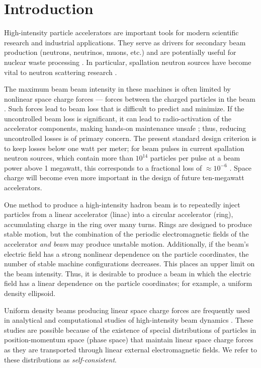 \chapter{Introduction}\label{chap-1}

High-intensity particle accelerators are important tools for modern scientific research and industrial applications. They serve as drivers for secondary beam production (neutrons, neutrinos, muons, etc.) \cite{Geer2009} and are potentially useful for nuclear waste processing \cite{Yee-Rendon2021}. In particular, spallation neutron sources have become vital to neutron scattering research \cite{Garoby2017}.

The maximum beam beam intensity in these machines is often limited by nonlinear space charge forces — forces between the charged particles in the beam \cite{Hofmann2017Book}. Such forces lead to beam loss that is difficult to predict and minimize. If the uncontrolled beam loss is significant, it can lead to radio-activation of the accelerator components, making hands-on maintenance unsafe \cite{Bungau2014}; thus, reducing uncontrolled losses is of primary concern. The present standard design criterion is to keep losses below one watt per meter; for beam pulses in current spallation neutron sources, which contain more than $10^{14}$ particles per pulse at a beam power above 1 megawatt, this corresponds to a fractional loss of $\approx 10^{-6}$ \cite{Henderson2014}. Space charge will become even more important in the design of future ten-megawatt accelerators. 
 
One method to produce a high-intensity hadron beam is to repeatedly inject particles from a linear accelerator (linac) into a circular accelerator (ring), accumulating charge in the ring over many turns. Rings are designed to produce stable motion, but the combination of the periodic electromagnetic fields of the accelerator \textit{and beam} may produce unstable motion. Additionally, if the beam's electric field has a strong nonlinear dependence on the particle coordinates, the number of stable machine configurations decreases. This places an upper limit on the beam intensity. Thus, it is desirable to produce a beam in which the electric field has a linear dependence on the particle coordinates; for example, a uniform density ellipsoid.

Uniform density beams producing linear space charge forces are frequently used in analytical and computational studies of high-intensity beam dynamics \cite{Lund2004}. These studies are possible because of the existence of special distributions of particles in position-momentum space (phase space) that maintain linear space charge forces as they are transported through linear external electromagnetic fields. We refer to these distributions as \textit{self-consistent}.

